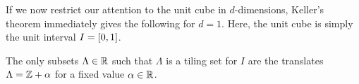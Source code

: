 \documentclass[../thesis.tex]{subfiles}
\begin{document}
If we now restrict our attention to the unit cube in $d$-dimensions, Keller's theorem immediately gives the following for $d=1$. Here, the unit cube is simply the unit interval $I = [0,1]$. %

\begin{lemma}\label{lem:tiling_unit_1d}
    The only subsets $\Lambda \in \mathbb{R}$ such that $\Lambda$ is a tiling set for $I$ are the translates $\Lambda = \mathbb{Z} +\alpha$ for a fixed value $\alpha\in \mathbb{R}$. 
\end{lemma}
\end{document}

